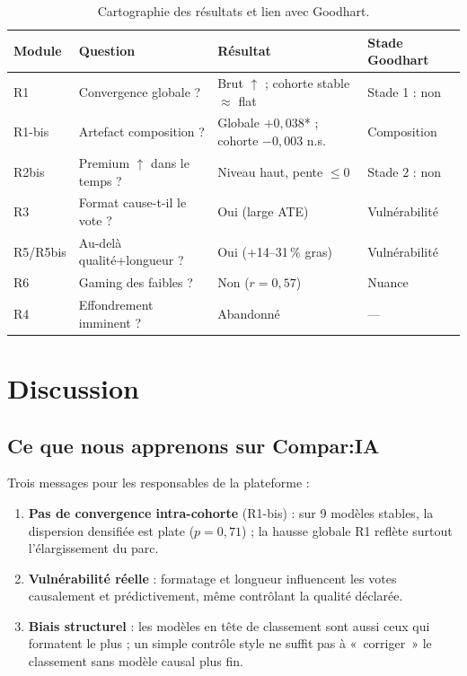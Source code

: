 \documentclass[11pt,a4paper]{article}
\begin{document}
\begin{table}[H]
\centering
\caption{Cartographie des résultats et lien avec Goodhart.}
\label{tab:synth}
\small
\begin{tabular}{llll}
\toprule
Module & Question & Résultat & Stade Goodhart \\
\midrule
R1 & Convergence globale ? & Brut $\uparrow$ ; cohorte stable $\approx$ flat & Stade 1 : non \\
R1-bis & Artefact composition ? & Globale $+0{,}038$* ; cohorte $-0{,}003$ n.s. & Composition \\
R2bis & Premium $\uparrow$ dans le temps ? & Niveau haut, pente $\leq 0$ & Stade 2 : non \\
R3 & Format cause-t-il le vote ? & Oui (large ATE) & Vulnérabilité \\
R5/R5bis & Au-delà qualité+longueur ? & Oui (+14--31\,\% gras) & Vulnérabilité \\
R6 & Gaming des faibles ? & Non ($r=0{,}57$) & Nuance \\
R4 & Effondrement imminent ? & Abandonné & --- \\
\bottomrule
\end{tabular}
\end{table}

\section{Discussion}
\label{sec:discussion}

\subsection{Ce que nous apprenons sur Compar:IA}

Trois messages pour les responsables de la plateforme :
\begin{enumerate}
  \item \textbf{Pas de convergence intra-cohorte} (R1-bis) : sur 9 modèles stables,
        la dispersion densifiée est plate ($p = 0{,}71$) ; la hausse globale R1
        reflète surtout l'élargissement du parc.
  \item \textbf{Vulnérabilité réelle} : formatage et longueur influencent les votes
        causalement et prédictivement, même contrôlant la qualité déclarée.
  \item \textbf{Biais structurel} : les modèles en tête de classement sont aussi
        ceux qui formatent le plus ; un simple contrôle style ne suffit pas à
        «~corriger~» le classement sans modèle causal plus fin.
\end{enumerate}
\end{document}
